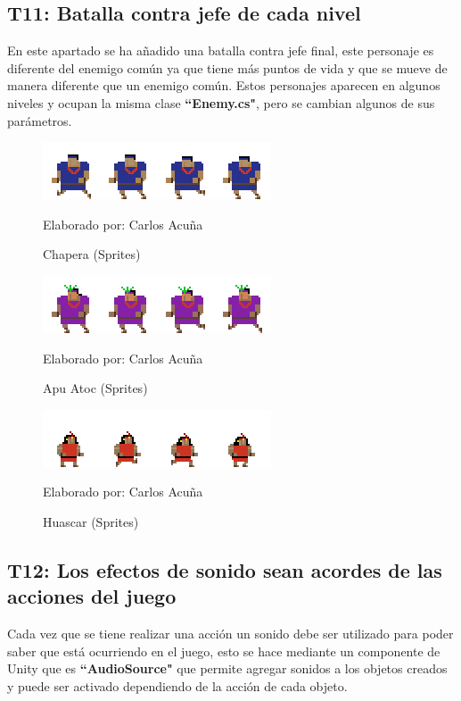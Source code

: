 \documentclass[a4paper, openright, 12pt]{report}
\begin{document}
\subsection*{T11: Batalla contra jefe de cada nivel}
En este apartado se ha añadido una batalla contra jefe final, este personaje es diferente del enemigo común ya que tiene más puntos de vida y que se mueve de manera diferente que un enemigo común. Estos personajes aparecen en algunos niveles y ocupan la misma clase \textbf{``Enemy.cs"}, pero se cambian algunos de sus parámetros.

\begin{figure}[!]
\captionsetup{justification=centering,margin=2cm}
\includegraphics[scale=5]{T11_01}
\centering
\caption{Chapera (Sprites)}
Elaborado por: Carlos Acuña
\label{fig:T11_01}
\end{figure}

\begin{figure}[!]
\captionsetup{justification=centering,margin=2cm}
\includegraphics[scale=5]{T11_02}
\centering
\caption{Apu Atoc (Sprites)}
Elaborado por: Carlos Acuña
\label{fig:T11_02}
\end{figure}

\begin{figure}[!]
\captionsetup{justification=centering,margin=2cm}
\includegraphics[scale=5]{T11_03}
\centering
\caption{Huascar (Sprites)}
Elaborado por: Carlos Acuña
\label{fig:T11_03}
\end{figure}

\subsection*{T12: Los efectos de sonido sean acordes de las acciones del juego}
\justify
Cada vez que se tiene realizar una acción un sonido debe ser utilizado para poder saber que está ocurriendo en el juego, esto se hace mediante un componente de Unity que es \textbf{``AudioSource"} que permite agregar sonidos a los objetos creados y puede ser activado dependiendo de la acción de cada objeto. 
\end{document}
